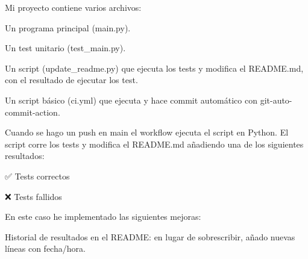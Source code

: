 Mi proyecto contiene varios archivos\+:
\begin{DoxyItemize}
\item Un programa principal (main.\+py).
\item Un test unitario (test\+\_\+main.\+py).
\item Un script (update\+\_\+readme.\+py) que ejecuta los tests y modifica el README.\+md, con el resultado de ejecutar los test.
\item Un script básico (ci.\+yml) que ejecuta y hace commit automático con git-\/auto-\/commit-\/action.
\end{DoxyItemize}

Cuando se hago un push en main el workflow ejecuta el script en Python. El script corre los tests y modifica el README.\+md añadiendo una de los siguientes resultados\+:

✅ Tests correctos

❌ Tests fallidos

En este caso he implementado las siguientes mejoras\+:
\begin{DoxyItemize}
\item Historial de resultados en el README\+: en lugar de sobrescribir, añado nuevas líneas con fecha/hora. 
\end{DoxyItemize}